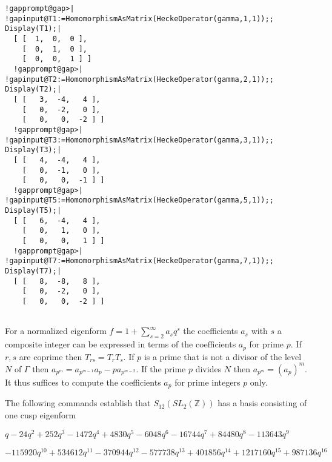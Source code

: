 \documentclass[a4paper,11pt]{report}
\begin{document}
{{\begin{Verbatim}[commandchars=!@|,fontsize=\small,frame=single,label=Example]
  !gapprompt@gap>| !gapinput@T1:=HomomorphismAsMatrix(HeckeOperator(gamma,1,1));; Display(T1);|
  [ [  1,  0,  0 ],
    [  0,  1,  0 ],
    [  0,  0,  1 ] ]
  !gapprompt@gap>| !gapinput@T2:=HomomorphismAsMatrix(HeckeOperator(gamma,2,1));; Display(T2);|
  [ [   3,  -4,   4 ],
    [   0,  -2,   0 ],
    [   0,   0,  -2 ] ]
  !gapprompt@gap>| !gapinput@T3:=HomomorphismAsMatrix(HeckeOperator(gamma,3,1));; Display(T3);|
  [ [   4,  -4,   4 ],
    [   0,  -1,   0 ],
    [   0,   0,  -1 ] ]
  !gapprompt@gap>| !gapinput@T5:=HomomorphismAsMatrix(HeckeOperator(gamma,5,1));; Display(T5);|
  [ [   6,  -4,   4 ],
    [   0,   1,   0 ],
    [   0,   0,   1 ] ]
  !gapprompt@gap>| !gapinput@T7:=HomomorphismAsMatrix(HeckeOperator(gamma,7,1));; Display(T7);|
  [ [   8,  -8,   8 ],
    [   0,  -2,   0 ],
    [   0,   0,  -2 ] ]
  
\end{Verbatim}
 

 For a normalized eigenform $f=1 + \sum_{s=2}^\infty a_sq^s$ the coefficients $a_s$ with $s$ a composite integer can be expressed in terms of the coefficients $a_p$ for prime $p$. If $r,s$ are coprime then $T_{rs} =T_rT_s$. If $p$ is a prime that is not a divisor of the level $N$ of $\Gamma$ then $a_{p^m} =a_{p^{m-1}}a_p - p a_{p^{m-2}}.$ If the prime $ p$ divides $N$ then $a_{p^m} = (a_p)^m$. It thus suffices to compute the coefficients $a_p$ for prime integers $p$ only. 

 The following commands establish that $S_{12}(SL_2(\mathbb Z))$ has a basis consisting of one cusp eigenform 

$q - 24q^2 + 252q^3 - 1472q^4 + 4830q^5 - 6048q^6 - 16744q^7 + 84480q^8 -
113643q^9 $ 

$- 115920q^{10} + 534612q^{11} - 370944q^{12} - 577738q^{13} + 401856q^{14} +
1217160q^{15} + 987136q^{16}$ 

}}
\end{document}
